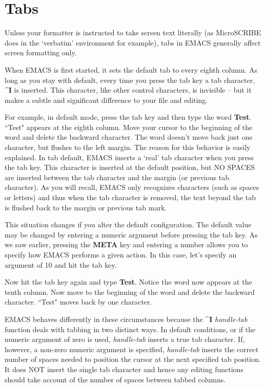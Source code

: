 \section{Tabs}

Unless your formatter is instructed to take screen text literally (as
MicroSCRIBE does in the `verbatim' environment for example), tabs in
EMACS generally affect screen formatting only.

When EMACS is first started, it sets the default tab to every eighth
column.  As long as you stay with default, every time you press the tab
key a tab character, {\bf{}\^{}I} is inserted.  This character, like other
control characters, is invisible -- but it makes a subtle and
significant difference to your file and editing.

For example, in default mode, press the tab key and then type the word
{\bf{}Test}.  ``Test" appears at the eighth column.  Move your cursor to the
beginning of the word and delete the backward character.  The word
doesn't move back just one character, but flushes to the left margin.
The reason for this behavior is easily explained.  In tab default, EMACS
inserts a `real' tab character when you press the tab key.  This
character is inserted at the default position, but NO SPACES are
inserted between the tab character and the margin (or previous tab
character).  As you will recall, EMACS only recognizes characters (such
as spaces or letters) and thus when the tab character is removed, the
text beyond the tab is flushed back to the margin or previous tab mark.

This situation changes if you alter the default configuration.  The
default value may be changed by entering a numeric argument before
pressing the tab key.  As we saw earlier, pressing the {\bf{}META} key and
entering a number allows you to specify how EMACS performs a given
action.  In this case, let's specify an argument of 10 and hit the tab
key.

Now hit the tab key again and type {\bf{}Test}.  Notice the word now
appears at the tenth column.  Now move to the beginning of the word and
delete the backward character.  ``Test" moves back by one character.

EMACS behaves differently in these circumstances because the {\bf{}\^{}I}
 {\it{}handle-tab}  function deals
with tabbing in two distinct ways.  In default conditions, or if the
numeric argument of zero is used, {\it{}handle-tab} inserts a true tab
character.  If, however, a non-zero numeric argument is specified,
{\it{}handle-tab} inserts the correct number of spaces needed to position
the cursor at the next specified tab position.  It does NOT insert the
single tab character and hence any editing functions should take account
of the number of spaces between tabbed columns.

